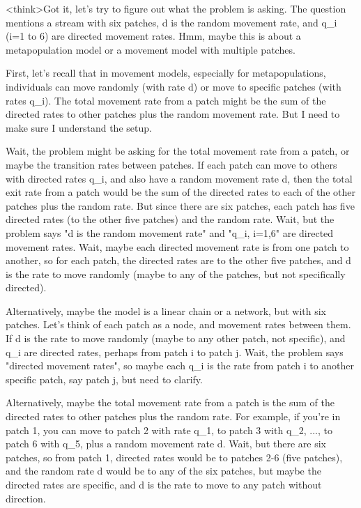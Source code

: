 <think>Got it, let's try to figure out what the problem is asking. The question mentions a stream with six patches, d is the random movement rate, and q_i (i=1 to 6) are directed movement rates. Hmm, maybe this is about a metapopulation model or a movement model with multiple patches. 

First, let's recall that in movement models, especially for metapopulations, individuals can move randomly (with rate d) or move to specific patches (with rates q_i). The total movement rate from a patch might be the sum of the directed rates to other patches plus the random movement rate. But I need to make sure I understand the setup. 

Wait, the problem might be asking for the total movement rate from a patch, or maybe the transition rates between patches. If each patch can move to others with directed rates q_i, and also have a random movement rate d, then the total exit rate from a patch would be the sum of the directed rates to each of the other patches plus the random rate. But since there are six patches, each patch has five directed rates (to the other five patches) and the random rate. Wait, but the problem says "d is the random movement rate" and "q_i, i=1,6" are directed movement rates. Wait, maybe each directed movement rate is from one patch to another, so for each patch, the directed rates are to the other five patches, and d is the rate to move randomly (maybe to any of the patches, but not specifically directed). 

Alternatively, maybe the model is a linear chain or a network, but with six patches. Let's think of each patch as a node, and movement rates between them. If d is the rate to move randomly (maybe to any other patch, not specific), and q_i are directed rates, perhaps from patch i to patch j. Wait, the problem says "directed movement rates", so maybe each q_i is the rate from patch i to another specific patch, say patch j, but need to clarify. 

Alternatively, maybe the total movement rate from a patch is the sum of the directed rates to other patches plus the random rate. For example, if you're in patch 1, you can move to patch 2 with rate q_1, to patch 3 with q_2, ..., to patch 6 with q_5, plus a random movement rate d. Wait, but there are six patches, so from patch 1, directed rates would be to patches 2-6 (five patches), and the random rate d would be to any of the six patches, but maybe the directed rates are specific, and d is the rate to move to any patch without direction. 

